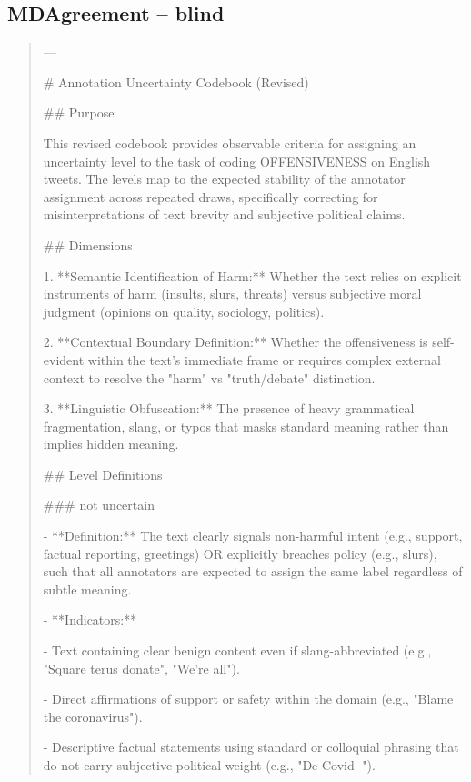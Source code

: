 \subsection*{MDAgreement -- blind}
\begin{quote}\small
---



# Annotation Uncertainty Codebook (Revised)



## Purpose

This revised codebook provides observable criteria for assigning an uncertainty level to the task of coding OFFENSIVENESS on English tweets. The levels map to the expected stability of the annotator assignment across repeated draws, specifically correcting for misinterpretations of text brevity and subjective political claims.



## Dimensions

1.  **Semantic Identification of Harm:** Whether the text relies on explicit instruments of harm (insults, slurs, threats) versus subjective moral judgment (opinions on quality, sociology, politics).

2.  **Contextual Boundary Definition:** Whether the offensiveness is self-evident within the text's immediate frame or requires complex external context to resolve the "harm" vs "truth/debate" distinction.

3.  **Linguistic Obfuscation:** The presence of heavy grammatical fragmentation, slang, or typos that masks standard meaning rather than implies hidden meaning.



## Level Definitions



### not uncertain

- **Definition:** The text clearly signals non-harmful intent (e.g., support, factual reporting, greetings) OR explicitly breaches policy (e.g., slurs), such that all annotators are expected to assign the same label regardless of subtle meaning.

- **Indicators:**

    - Text containing clear benign content even if slang-abbreviated (e.g., "Square terus donate", "We're all").

    - Direct affirmations of support or safety within the domain (e.g., "Blame the coronavirus").

    - Descriptive factual statements using standard or colloquial phrasing that do not carry subjective political weight (e.g., "De Covid 🤪").


\end{quote}
